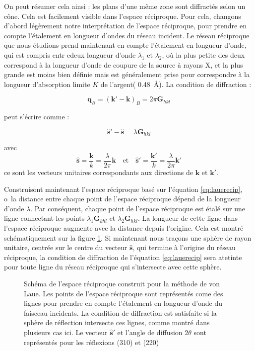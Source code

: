 On peut résumer cela ainsi : les plans d'une même zone sont diffractés selon un cône. Cela est facilement visible dans l'espace réciproque. Pour cela, changons d'abord légèrement notre interprétation de l'espace réciproque, pour prendre en compte l'étalement en longueur d'ondes du réseau incident. Le réseau réciproque que nous étudions prend maintenant en compte l'étalement en longueur d'onde, qui est compris entr edeux longueur d'onde $\lambda_1$ et $\lambda_2$, où la plus petite des deux correspond à la longueur d'onde de coupure de la source à rayons X, et la plus grande est moins bien définie mais est généralement prise pour correspondre à la longueur d'absorption limite $K$ de l'argent( \SI{0.48}{\angstrom}).
La condition de diffraction :

\begin{equation}
    \mathbf{q}_B = (\mathbf{k'-k})_B = 2 \pi \mathbf{G}_{hkl}
\end{equation}

peut s'écrire comme :

\begin{equation}
    \label{eq:lauerecip}
    \mathbf{\hat{s}' - \hat{s}} = \lambda \mathbf{G}_{hkl}
\end{equation}

avec
\begin{equation}
    \mathbf{\hat{s}} = \frac{\mathbf{k}}{k} = \frac{\lambda}{2\pi}\mathbf{k}\quad\text{et}\quad
    \mathbf{\hat{s}'} = \frac{\mathbf{k'}}{k} = \frac{\lambda}{2\pi}\mathbf{k'}
\end{equation}
ce sont les vecteurs unitaires correspondants aux directions de $\mathbf{k}$ et $\mathbf{k'}$.

Construisont maintenant l'espace réciproque basé sur l'équation \ref{eq:lauerecip}, o\ la distance entre chaque point de l'espace réciproque dépend de la longueur d'onde $\lambda$. Par conséquent, chaque point de l'espace réciproque est étalé sur une ligne connectant les points $\lambda_1\mathbf{G}_{khl}$ et $\lambda_2\mathbf{G}_{hkl}$. La longueur de cette ligne dans l'espace réciproque augmente avec la distance depuis l'origine. Cela est montré schématiquement sur la figure \ref{fig:lauerecip}. Si maintenant nous traçons une sphère de rayon unitaire, centrée sur le centre du vecteur $\mathbf{\hat{s}}$, qui termine à l'origine du réseau réciproque, la condition de diffraction de l'équation \ref{eq:lauerecip} sera atetinte pour toute ligne du réseau réciproque qui s'intersecte avec cette sphère.

\begin{figure}
    \TODO
    \caption{Schéma de l'espace réciproque construit pour la méthode de von Laue. Les points de l'espace réciproque sont représentés come des lignes pour prendre en compte l'étalement en longueur d'onde du faisceau incidents. La condition de diffraction est satisfaite si la sphère de réflection intersecte ces lignes, comme montré dans plusieurs cas ici. Le vecteur $\mathbf{\hat{s}'}$ et l'angle de diffusion $2\theta$ sont représentés pour les réflexions (310) et (220)}
    \label{fig:lauerecip}
\end{figure}

